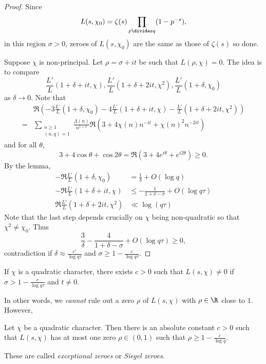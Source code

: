 \documentclass[a4paper]{article}
\theoremstyle{definition}
\begin{document}
\begin{proof}
  Since
  \[
    L(s, \chi_0) = \zeta(s) \prod_{p \divides q} (1 - p^{-s}),
  \]
  in this region \(\sigma > 0\), zeroes of \(L(s, \chi_0)\) are the same as those of \(\zeta(s)\) so done.

  Suppose \(\chi\) is non-principal. Let \(\rho = \sigma + it\) be such that \(L(\rho, \chi) = 0\). The idea is to compare
  \[
    \frac{L'}{L}(1 + \delta + it, \chi),
    \frac{L'}{L}(1 + \delta + 2it, \chi^2),
    \frac{L'}{L}(1 + \delta, \chi_0)
  \]
  as \(\delta \to 0\). Note that
  \begin{align*}
    &\Re(-3 \frac{L'}{L}(1 + \delta, \chi_0) - 4 \frac{L'}{L}(1 + \delta + it, \chi) - \frac{L'}{L}(1 + \delta + 2it, \chi^2)) \\
    =& \sum_{\substack{n \geq 1 \\ (n, q) = 1}} \frac{\Lambda(n)}{n^{1 + \delta}} \Re(3 + 4 \chi(n) n^{-it} + \chi(n)^2 n^{-2it})
  \end{align*}
  and for all \(\theta\),
  \[
    3 + 4 \cos \theta + \cos 2\theta = \Re (3 + 4e^{i\theta} + e^{i2\theta}) \geq 0.
  \]
  By the lemma,
  \begin{align*}
    -\Re \frac{L'}{L}(1 + \delta, \chi_0) &= \frac{1}{\delta} + O(\log q) \\
    -\Re \frac{L'}{L}(1 + \delta + it, \chi) &\leq - \frac{1}{1 + \delta - \sigma} + O(\log q\tau) \\
    \Re \frac{L'}{L}(1 + \delta + 2it, \chi^2) &\ll \log(q\tau)
  \end{align*}
  Note that the last step depends crucially on \(\chi\) being non-quadratic so that \(\chi^2 \neq \chi_0\). Thus
  \[
    \frac{3}{\delta} - \frac{4}{1 + \delta - \sigma} + O(\log q\tau) \geq 0,
  \]
  contradiction if \(\delta \approx \frac{c'}{\log q\tau}\) and \(\sigma \geq 1 - \frac{c}{\log q\tau}\).
\end{proof}

\begin{theorem}
  If \(\chi\) is a quadratic character, there exists \(c > 0\) such that \(L(s, \chi) \neq 0\) if \(\sigma > 1 - \frac{c}{\log q\tau}\) and \(t \neq 0\).
\end{theorem}
In other words, we \emph{cannot} rule out a zero \(\rho\) of \(L(s, \chi)\) with \(\rho \in \R\) close to \(1\). However,

\begin{theorem}
  Let \(\chi\) be a quadratic character. Then there is an absolute constant \(c > 0\) such that \(L(s, \chi)\) has at most one zero \(\rho \in (0, 1)\) such that \(\rho \geq 1 - \frac{c}{\log q}\).
\end{theorem}
These are called \emph{exceptional zeroes} or \emph{Siegel zeroes}.
\end{document}
